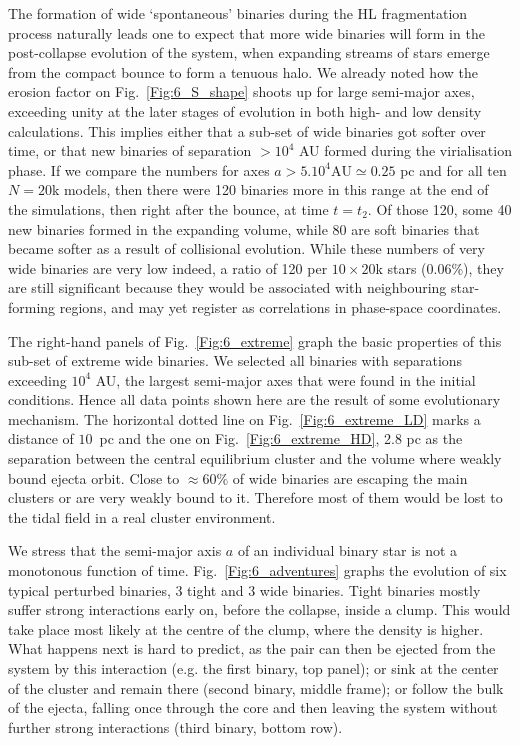 The formation of wide `spontaneous' binaries during the HL fragmentation process naturally leads one to expect that more wide binaries will form in the post-collapse evolution of the system, when expanding streams of stars emerge from the compact bounce to form a tenuous halo. We already noted how the erosion factor on Fig.~\ref{Fig:6_S_shape} shoots up for large semi-major axes, exceeding unity at the later stages of evolution in both high- and low density calculations. This implies either that a sub-set of wide binaries got softer over time, or that new binaries of separation $> 10^4$ AU formed during the virialisation phase. If we compare the numbers for axes $a > 5.10^4 \textrm{AU} \simeq 0.25$ pc and for all ten $N = 20$k models, then there were 120 binaries more  in this range at the end of the simulations, then right after the bounce, at time $t = t_2$.  Of those 120, some 40 new binaries formed in the expanding volume, while 80 are  soft binaries that became softer as a result of collisional evolution. While these numbers of very wide binaries  are very low indeed, a ratio of 120 per $10 \times 20$k  stars (0.06\%), they are still significant because they would be associated with neighbouring star-forming regions, and  may yet register as correlations in phase-space coordinates. 
  

The right-hand panels of Fig.~\ref{Fig:6_extreme} graph the basic properties of this sub-set of extreme wide binaries. We selected all  binaries with separations exceeding $10^4$ AU, the largest semi-major axes that were found in the initial conditions. Hence all data points shown here are the result of some evolutionary mechanism. The horizontal dotted line on Fig.~\ref{Fig:6_extreme_LD} marks a distance of $10$~pc and the one on Fig.~\ref{Fig:6_extreme_HD}, 2.8 pc as the separation between the central  equilibrium cluster and the volume where weakly bound ejecta orbit. Close to $\approx 60\% $ of wide binaries are escaping the main clusters or are very weakly bound to it. Therefore most of them would be lost to the tidal field in a real cluster environment.  
 

We stress that the semi-major axis $a$ of an individual binary star is not a monotonous function of time. Fig.~\ref{Fig:6_adventures} graphs the evolution of six typical perturbed binaries, 3 tight and 3 wide binaries. Tight binaries mostly suffer strong interactions early on, before the collapse, inside a clump. This would take place  most likely at the centre of the clump, where the density is higher. What happens next is hard to predict, as the pair can then be ejected from the system by this interaction (e.g. the first binary, top panel); or  sink at the center of the cluster and remain there (second binary, middle frame); or follow the bulk of the ejecta,  falling once through the core and then leaving the system without further strong interactions  (third binary, bottom row). 

